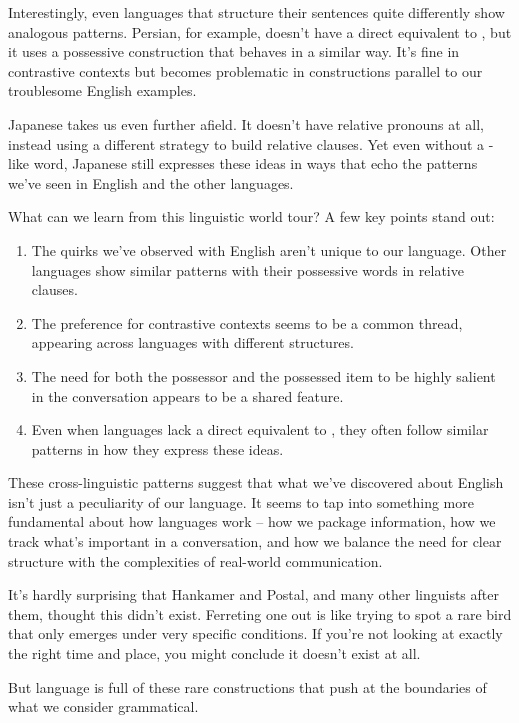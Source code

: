 Interestingly, even languages that structure their sentences quite differently show analogous patterns. Persian, for example, doesn't have a direct equivalent to , but it uses a possessive construction that behaves in a similar way. It's fine in contrastive contexts but becomes problematic in constructions parallel to our troublesome English examples.

Japanese takes us even further afield. It doesn't have relative pronouns at all, instead using a different strategy to build relative clauses. Yet even without a -like word, Japanese still expresses these ideas in ways that echo the patterns we've seen in English and the other languages.

What can we learn from this linguistic world tour? A few key points stand out:

\begin{enumerate}
    \item The quirks we've observed with English  aren't unique to our language. Other languages show similar patterns with their possessive words in relative clauses.

    \item The preference for contrastive contexts seems to be a common thread, appearing across languages with different structures.

    \item The need for both the possessor and the possessed item to be highly salient in the conversation appears to be a shared feature.

    \item Even when languages lack a direct equivalent to , they often follow similar patterns in how they express these ideas.
\end{enumerate}

These cross-linguistic patterns suggest that what we've discovered about English  isn't just a peculiarity of our language. It seems to tap into something more fundamental about how languages work -- how we package information, how we track what's important in a conversation, and how we balance the need for clear structure with the complexities of real-world communication.

\bigskip

It's hardly surprising that Hankamer and Postal, and many other linguists after them, thought this  didn't exist. Ferreting one out is like trying to spot a rare bird that only emerges under very specific conditions. If you're not looking at exactly the right time and place, you might conclude it doesn't exist at all.

But language is full of these rare constructions that push at the boundaries of what we consider grammatical.
